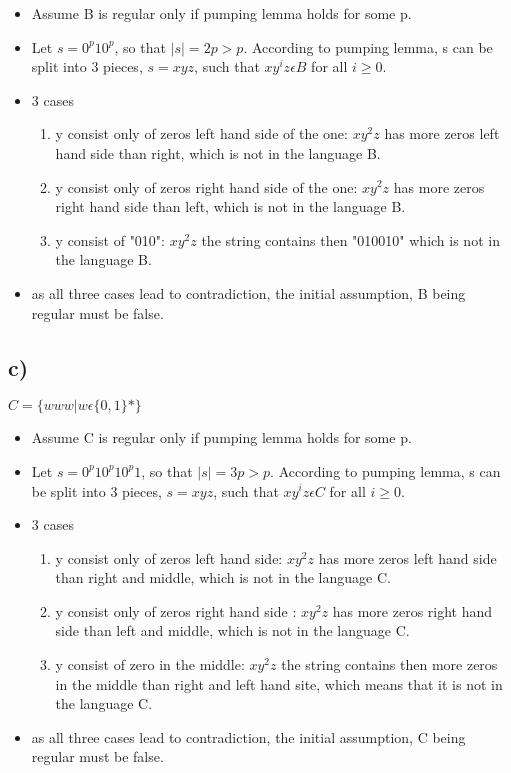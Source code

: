 \documentclass[]{article}
\begin{document}
\begin{itemize}
	\item Assume B is regular only if pumping lemma holds for some p.
	\item Let $s = 0^{p}10^{p}$, so that $|s| = 2p > p$. According to pumping lemma, s can be split into 3 pieces, $s = xyz$, such that $xy^{i}z \epsilon B$ for all $i\ge0$.
	\item 3 cases
	\begin{enumerate}
		\item y consist only of zeros left hand side of the one: 				$xy^{2}z$ has more zeros left hand side than right, which is 		not in the language B.
		\item y consist only of zeros right hand side of the one: 				$xy^{2}z$ has more zeros right hand side than left, which is 		not in the language B.
		\item y consist of "010": $xy^{2}z$ the string contains then 		"010010" which is not in the language B.
	\end{enumerate}
	\item as all three cases lead to contradiction, the initial assumption, B being regular must be false.
\end{itemize}

\pagebreak

\subsection*{c)}
$C = \{www|w\epsilon \{0,1\}*\}$
\begin{itemize}
	\item Assume C is regular only if pumping lemma holds for some p.
	\item Let $s = 0^{p}10^{p}10^{p}1$, so that $|s| = 3p > p$. According to pumping lemma, s can be split into 3 pieces, $s = xyz$, such that $xy^{i}z \epsilon C$ for all $i\ge0$.
	\item 3 cases
	\begin{enumerate}
		\item y consist only of zeros left hand side: 				$xy^{2}z$ has more zeros left hand side than right and middle, which is 		not in the language C.
		\item y consist only of zeros right hand side : 				$xy^{2}z$ has more zeros right hand side than left and middle, which is 		not in the language C.
		\item y consist of zero in the middle: $xy^{2}z$ the string contains then more zeros in the middle than right and left hand site, which means that it is not in the language C.
	\end{enumerate}
	\item as all three cases lead to contradiction, the initial assumption, C being regular must be false.
\end{itemize}
\end{document}
